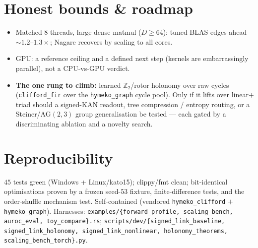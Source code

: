 \documentclass[11pt]{article}
\theoremstyle{definition}\newtheorem{remark}{Remark}
\begin{document}
\section{Honest bounds \& roadmap}
\begin{itemize}\itemsep1pt
  \item Matched $8$ threads, large dense matmul ($D\ge64$): tuned BLAS edges ahead
  $\sim1.2$--$1.3\times$; Nagare recovers by scaling to all cores.
  \item GPU: a reference ceiling and a defined next step (kernels are
  embarrassingly parallel), not a CPU-vs-GPU verdict.
  \item \textbf{The one rung to climb:} learned $\mathbb{Z}_2$/rotor holonomy over
  raw cycles (\texttt{clifford\_fir} over the \texttt{hymeko\_graph} cycle pool).
  Only if it lifts over linear$+$triad should a signed-KAN readout, tree
  compression / entropy routing, or a Steiner/AG$(2,3)$ group generalisation be
  tested --- each gated by a discriminating ablation and a novelty search.
\end{itemize}

\section{Reproducibility}
$45$ tests green (Windows + Linux/kato15); clippy/fmt clean; bit-identical
optimisations proven by a frozen seed-$53$ fixture, finite-difference tests, and
the order-shuffle mechanism test. Self-contained (vendored \texttt{hymeko\_clifford}
$+$ \texttt{hymeko\_graph}). Harnesses: \texttt{examples/\{forward\_profile,
scaling\_bench, auroc\_eval, toy\_compare\}.rs}; \texttt{scripts/dev/\{signed\_link\_baseline,
signed\_link\_holonomy, signed\_link\_nonlinear, holonomy\_theorems, scaling\_bench\_torch\}.py}.
\end{document}
